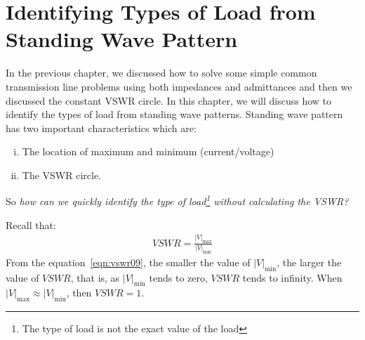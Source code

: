 \chapter{Identifying Types of Load from Standing Wave Pattern}\label{lec:lec9}

In the previous chapter, we discussed how to solve some simple common transmission line problems using both impedances and admittances and then we discussed the constant VSWR circle. In this chapter, we will discuss how to identify the types of load from standing wave patterns. Standing wave pattern has two important characteristics which are:
\begin{enumerate}[(i)]
\item The location of maximum and minimum (current/voltage)
\item The VSWR circle.
\end{enumerate}
So \emph{how can we quickly identify the type of load\footnote{The type of load is not the exact value of the load} without calculating the VSWR?}

Recall that:
\begin{align}
VSWR = \frac{|V|_\max}{|V|_\min}
\label{eqn:vswr09}
\end{align}
From the equation~\eqref{eqn:vswr09}, the smaller the value of $|V|_\min$, the larger the value of ${VSWR}$, that is, as $|V|_\min$ tends to zero, ${VSWR}$ tends to infinity. When $|V|_\max{\approx}|V|_\min$, then $VSWR = 1$.

